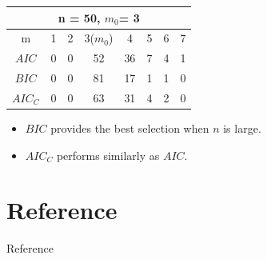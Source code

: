 \documentclass[11pt]{beamer}
\begin{document}
\begin{frame}
\begin{center}
\begin{tabular}{ c | c c c c c c c}
\hline
 \multicolumn{8}{c}{n = 50, $m_0$= 3} \\
 \hline
    m  & 1 & 2 & 3($m_0$) & 4 & 5 & 6 & 7\\
    \hline
 $AIC$ & 0 & 0 & 52 & 36 & 7 & 4 &1\\ 
 $BIC$ & 0 & 0 & 81 & 17 & 1 & 1 & 0 \\  
 $AIC_C$ & 0 & 0 & 63 & 31 & 4 & 2 & 0 
\end{tabular}
\end{center}
 \begin{itemize}
    \item $BIC$ provides the best selection when $n$ is large.
     \item $AIC_C$ performs similarly as $AIC$.
 \end{itemize}
 
\end{frame}



\section{Reference}
\begin{frame}{Reference}
    
\end{frame}
\end{document}
